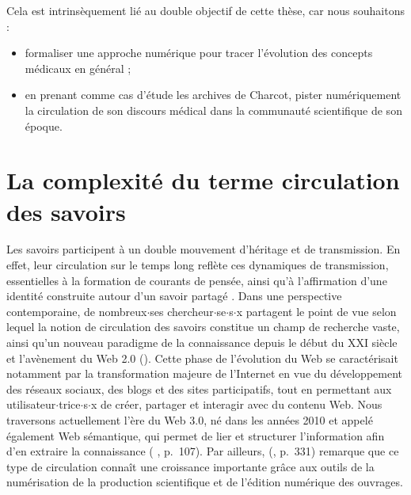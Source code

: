 Cela est intrinsèquement lié au double objectif de cette thèse, car nous souhaitons :
\begin{itemize} 
	\item formaliser une approche numérique pour tracer l'évolution des concepts médicaux en général ;
	\item en prenant comme cas d'étude les archives de Charcot, pister numériquement la circulation de son discours médical dans la communauté scientifique de son époque.
\end{itemize}
\medskip








\section{La complexité du terme \og{}circulation des savoirs\fg{}}

Les savoirs participent à un double mouvement d'héritage et de transmission. En effet, leur circulation sur le temps long reflète ces dynamiques de transmission, essentielles à la formation de courants de pensée, ainsi qu'à l'affirmation d’une identité construite autour d'un savoir partagé \citep[p.~251]{adell2011chapitre}. Dans une perspective contemporaine, de nombreux$\cdot$ses chercheur$\cdot$se$\cdot$s$\cdot$x partagent le point de vue selon lequel la notion de circulation des savoirs constitue un champ de recherche vaste, ainsi qu'un nouveau paradigme de la connaissance depuis le début du XXI\ieme{} siècle et l'avènement du Web \textsc{2.0} (\citealp{landais2014frederic,quet2014frederic}). Cette phase de l'évolution du Web se caractérisait notamment par la transformation majeure de l'Internet en vue du développement des réseaux sociaux, des blogs et des sites participatifs, tout en permettant aux utilisateur$\cdot$trice$\cdot$s$\cdot$x de créer, partager et interagir avec du contenu Web. Nous traversons actuellement l'ère du Web \textsc{3.0}, né dans les années 2010 et appelé également \og{}Web sémantique\fg{}, qui permet de lier et structurer l'information afin d'en extraire la connaissance (\citeauthor{andrade2013sociologie} \citeyear{andrade2013sociologie}, p.~107). Par ailleurs, \citeauthor{landais2014frederic} (\citeyear{landais2014frederic}, p.~331) remarque que ce type de circulation connaît une croissance importante grâce aux outils de la numérisation de la production scientifique et de l'édition numérique des ouvrages.

